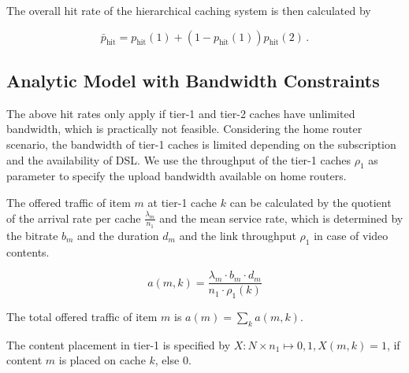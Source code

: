 The overall hit rate of the hierarchical caching system is then calculated by

\begin{equation}
\bar{p}_\text{hit} = p_\text{hit}(1)+(1-p_\text{hit}(1))p_\text{hit}(2) \, .
\end{equation}


\subsection{Analytic Model with Bandwidth Constraints}

The above hit rates only apply if tier-1 and tier-2 caches have unlimited bandwidth, which is practically not feasible.
Considering the home router scenario, the bandwidth of tier-1 caches is limited depending on the subscription and the availability of DSL.
We use the throughput of the tier-1 caches $\rho_1$ as parameter to specify the upload bandwidth available on home routers.




The offered traffic of item $m$ at tier-1 cache $k$ can be calculated by the quotient of the arrival rate per cache $\frac{\lambda_m}{n_1}$ and the mean service rate, which is determined by the bitrate $b_m$ and the duration $d_m$ and the link throughput $\rho_1$ in case of video contents.

\begin{equation}
a(m,k) = \frac{\lambda_m \cdot b_m \cdot d_m}{n_1\cdot \rho_1(k)}
\end{equation}

The total offered traffic of item $m$ is $a(m) = \sum_k a(m,k)$.


The content placement in tier-1 is specified by $X: N \times n_1\mapsto {0,1}, X(m,k) = 1$, if content $m$ is placed on cache $k$, else $0$.


